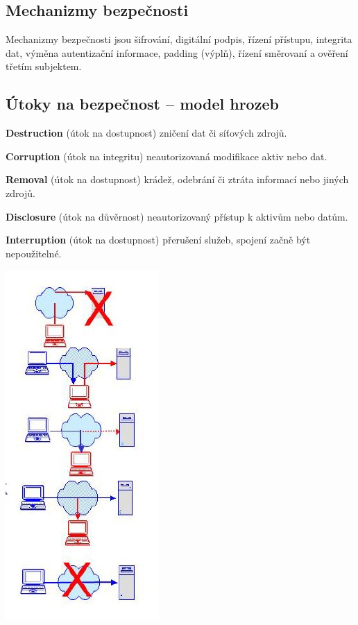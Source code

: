 \subsection{Mechanizmy bezpečnosti}

Mechanizmy bezpečnosti jsou šifrování, digitální podpis, řízení přístupu, integrita dat, výměna autentizační informace, padding (výplň), řízení směrovaní a ověření třetím subjektem.

\subsection{Útoky na bezpečnost -- model hrozeb}
\begin{multicols}{2}
\noindent \textbf{Destruction} (útok na dostupnost) zničení dat či síťových zdrojů.

\noindent \textbf{Corruption} (útok na integritu) neautorizovaná modifikace aktiv nebo dat.

\noindent \textbf{Removal} (útok na dostupnost) krádež, odebrání či ztráta informací nebo jiných zdrojů.

\noindent \textbf{Disclosure} (útok na důvěrnost) neautorizovaný přístup k aktivům nebo datům.

\noindent \textbf{Interruption} (útok na dostupnost) přerušení služeb, spojení začně být nepoužitelné.

\begin{center}
    \includegraphics[scale = 0.6]{images/threatModel.JPG}
\end{center}
\end{multicols}

